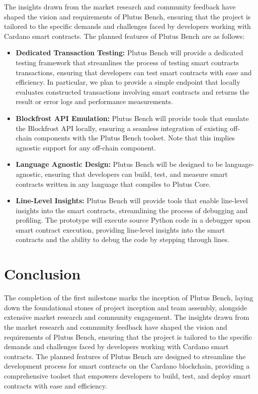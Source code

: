 \documentclass[11pt]{article}
\begin{document}
The insights drawn from the market research and community feedback have shaped the vision and requirements of Plutus Bench,
ensuring that the project is tailored to the specific demands and challenges faced by developers working with Cardano smart contracts.
The planned features of Plutus Bench are as follows:

\begin{itemize}
    \item \textbf{Dedicated Transaction Testing:} Plutus Bench will provide a dedicated testing framework that streamlines the process of testing smart contracts transactions, ensuring that developers can test smart contracts with ease and efficiency.  In particular, we plan to provide a simple endpoint that locally evaluates constructed transactions involving smart contracts and returns the result or error logs and performance measurements.
    \item \textbf{Blockfrost API Emulation:} Plutus Bench will provide tools that emulate the Blockfrost API locally, ensuring a seamless integration of existing off-chain components with the Plutus Bench toolset. Note that this implies agnostic support for any off-chain component.
    \item \textbf{Language Agnostic Design:} Plutus Bench will be designed to be language-agnostic, ensuring that developers can build, test, and measure smart contracts written in any language that compiles to Plutus Core.
    \item \textbf{Line-Level Insights:} Plutus Bench will provide tools that enable line-level insights into the smart contracts, streamlining the process of debugging and profiling. The prototype will execute source Python code in a debugger upon smart contract execution, providing line-level insights into the smart contracts and the ability to debug the code by stepping through lines.
\end{itemize}

\section{Conclusion}

The completion of the first milestone marks the inception of Plutus Bench, laying down the foundational stones of project inception and team assembly,
alongside extensive market research and community engagement.
The insights drawn from the market research and community feedback have shaped the vision and requirements of Plutus Bench,
ensuring that the project is tailored to the specific demands and challenges faced by developers working with Cardano smart contracts.
The planned features of Plutus Bench are designed to streamline the development process for smart contracts on the Cardano blockchain,
providing a comprehensive toolset that empowers developers to build, test, and deploy smart contracts with ease and efficiency.
\end{document}
